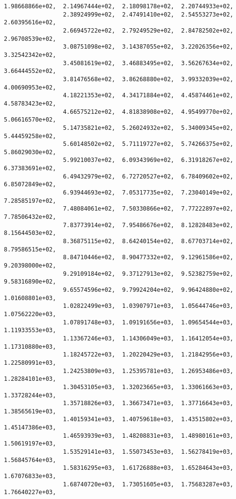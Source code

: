 \documentclass[11pt]{article}
\begin{document}
\begin{Verbatim}[commandchars=\\\{\}]
                 1.98668866e+02,  2.14967444e+02,  2.18098178e+02,  2.20744933e+02,
                 2.38924999e+02,  2.47491410e+02,  2.54553273e+02,  2.60395616e+02,
                 2.66945722e+02,  2.79249529e+02,  2.84782502e+02,  2.96708539e+02,
                 3.08751098e+02,  3.14387055e+02,  3.22026356e+02,  3.32542342e+02,
                 3.45081619e+02,  3.46883495e+02,  3.56267634e+02,  3.66444552e+02,
                 3.81476568e+02,  3.86268880e+02,  3.99332039e+02,  4.00690953e+02,
                 4.18221353e+02,  4.34171884e+02,  4.45874461e+02,  4.58783423e+02,
                 4.66575212e+02,  4.81838908e+02,  4.95499770e+02,  5.06616570e+02,
                 5.14735821e+02,  5.26024932e+02,  5.34009345e+02,  5.44459258e+02,
                 5.60148502e+02,  5.71119727e+02,  5.74266375e+02,  5.86029030e+02,
                 5.99210037e+02,  6.09343969e+02,  6.31918267e+02,  6.37383691e+02,
                 6.49432979e+02,  6.72720527e+02,  6.78409602e+02,  6.85072849e+02,
                 6.93944693e+02,  7.05317735e+02,  7.23040149e+02,  7.28585197e+02,
                 7.48084061e+02,  7.50330866e+02,  7.77222897e+02,  7.78506432e+02,
                 7.83773914e+02,  7.95486676e+02,  8.12828483e+02,  8.15644503e+02,
                 8.36875115e+02,  8.64240154e+02,  8.67703714e+02,  8.79586515e+02,
                 8.84710446e+02,  8.90477332e+02,  9.12961586e+02,  9.20398000e+02,
                 9.29109184e+02,  9.37127913e+02,  9.52382759e+02,  9.58316890e+02,
                 9.65574596e+02,  9.79924204e+02,  9.96424880e+02,  1.01608801e+03,
                 1.02822499e+03,  1.03907971e+03,  1.05644746e+03,  1.07562220e+03,
                 1.07891748e+03,  1.09191656e+03,  1.09654544e+03,  1.11933553e+03,
                 1.13367246e+03,  1.14306049e+03,  1.16412054e+03,  1.17310880e+03,
                 1.18245722e+03,  1.20220429e+03,  1.21842956e+03,  1.22580991e+03,
                 1.24253809e+03,  1.25395781e+03,  1.26953486e+03,  1.28284101e+03,
                 1.30453105e+03,  1.32023665e+03,  1.33061663e+03,  1.33728244e+03,
                 1.35718826e+03,  1.36673471e+03,  1.37716643e+03,  1.38565619e+03,
                 1.40159341e+03,  1.40759618e+03,  1.43515802e+03,  1.45147386e+03,
                 1.46593939e+03,  1.48208831e+03,  1.48980161e+03,  1.50619197e+03,
                 1.53529141e+03,  1.55073453e+03,  1.56278419e+03,  1.56845764e+03,
                 1.58316295e+03,  1.61726888e+03,  1.65284643e+03,  1.67076833e+03,
                 1.68740720e+03,  1.73051605e+03,  1.75683287e+03,  1.76640227e+03,

\end{Verbatim}
\end{document}
